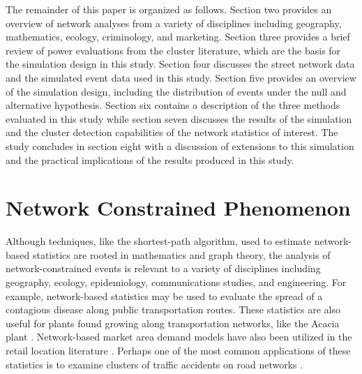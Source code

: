 \documentclass[12pt, letterpaper]{article}
\begin{document}
The remainder of this paper is organized as follows. Section two provides an overview of network analyses from a variety of disciplines including geography, mathematics, ecology, criminology, and marketing. Section three provides a brief review of power evaluations from the cluster literature, which are the basis for the simulation design in this study. Section four discusses the street network data and the simulated event data used in this study. Section five provides an overview of the simulation design, including the distribution of events under the null and alternative hypothesis. Section six contains a description of the three methods evaluated in this study while section seven discusses the results of the simulation and the cluster detection capabilities of the network statistics of interest. The study concludes in section eight with a discussion of extensions to this simulation and the practical implications of the results produced in this study.

\section{Network Constrained Phenomenon}

Although techniques, like the shortest-path algorithm, \citep{dijkstra1959note} used to estimate network-based statistics are rooted in mathematics and graph theory, the analysis of network-constrained events is relevant to a variety of disciplines including geography, ecology, epidemiology, communications studies, and engineering. For example, network-based statistics may be used to evaluate the spread of a contagious disease along public transportation routes. These statistics are also useful for plants found growing along transportation networks, like the Acacia plant \citep{spooner2004spatial}. Network-based market area demand models have also been utilized in the retail location literature \citep{okabe2001computational}. Perhaps one of the most common applications of these statistics is to examine clusters of traffic accidents on road networks \citep{yamada2004comparison} \citep{okabe2009kernel}.
\end{document}
